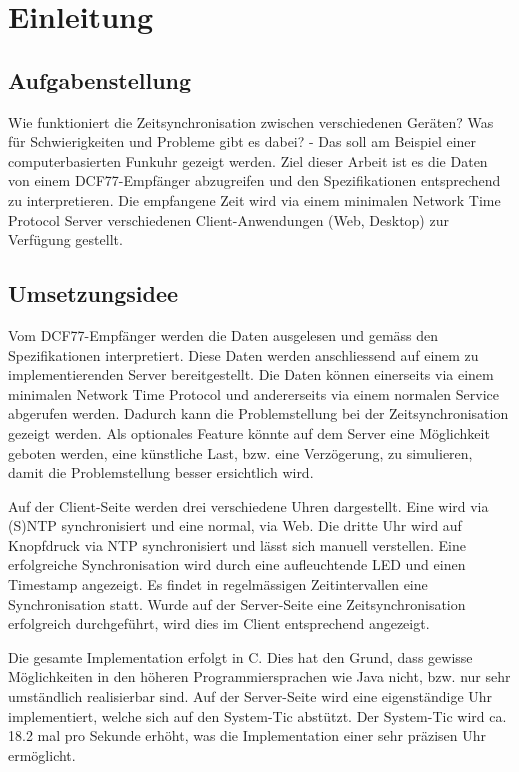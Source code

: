 
\chapter{Einleitung}



\section{Aufgabenstellung}

Wie funktioniert die Zeitsynchronisation zwischen verschiedenen Geräten? Was für Schwierigkeiten und Probleme gibt es dabei? - Das soll am Beispiel einer computerbasierten Funkuhr gezeigt werden. Ziel dieser Arbeit ist es die Daten von einem DCF77-Empfänger abzugreifen und den Spezifikationen entsprechend zu interpretieren. Die empfangene Zeit wird via einem minimalen Network Time Protocol Server verschiedenen Client-Anwendungen (Web, Desktop) zur Verfügung gestellt.

\section{Umsetzungsidee}

Vom DCF77-Empfänger werden die Daten ausgelesen und gemäss den Spezifikationen interpretiert. Diese Daten werden anschliessend auf einem zu implementierenden Server bereitgestellt. Die Daten können einerseits via einem minimalen Network Time Protocol und andererseits via einem normalen Service abgerufen werden. Dadurch kann die Problemstellung bei der Zeitsynchronisation gezeigt werden. Als optionales Feature könnte auf dem Server eine Möglichkeit geboten werden, eine künstliche Last, bzw. eine Verzögerung, zu simulieren, damit die Problemstellung besser ersichtlich wird.

Auf der Client-Seite werden drei verschiedene Uhren dargestellt. Eine wird via (S)NTP synchronisiert und eine normal, via Web. Die dritte Uhr wird auf Knopfdruck via NTP synchronisiert und lässt sich manuell verstellen. Eine erfolgreiche Synchronisation wird durch eine aufleuchtende LED und einen Timestamp angezeigt. Es findet in regelmässigen Zeitintervallen eine Synchronisation statt. Wurde auf der Server-Seite eine Zeitsynchronisation erfolgreich durchgeführt, wird dies im Client entsprechend angezeigt.

Die gesamte Implementation erfolgt in C. Dies hat den Grund, dass gewisse Möglichkeiten in den höheren Programmiersprachen wie Java nicht, bzw. nur sehr umständlich realisierbar sind. Auf der Server-Seite wird eine eigenständige Uhr implementiert, welche sich auf den System-Tic abstützt. Der System-Tic wird ca. 18.2 mal pro Sekunde erhöht, was die Implementation einer sehr präzisen Uhr ermöglicht. 
